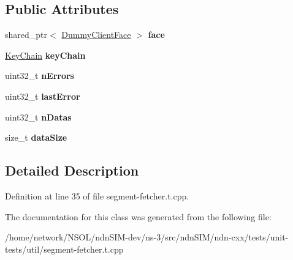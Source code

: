 \subsection*{Public Attributes}
\begin{DoxyCompactItemize}
\item 
shared\+\_\+ptr$<$ \hyperlink{classndn_1_1util_1_1DummyClientFace}{Dummy\+Client\+Face} $>$ {\bfseries face}\hypertarget{classndn_1_1util_1_1tests_1_1Fixture_aa4ae83fca5774611d7d7ae32d0dc9b52}{}\label{classndn_1_1util_1_1tests_1_1Fixture_aa4ae83fca5774611d7d7ae32d0dc9b52}

\item 
\hyperlink{classndn_1_1security_1_1KeyChain}{Key\+Chain} {\bfseries key\+Chain}\hypertarget{classndn_1_1util_1_1tests_1_1Fixture_a4f044e75670a6374d681121a3432ed2f}{}\label{classndn_1_1util_1_1tests_1_1Fixture_a4f044e75670a6374d681121a3432ed2f}

\item 
uint32\+\_\+t {\bfseries n\+Errors}\hypertarget{classndn_1_1util_1_1tests_1_1Fixture_a155892280dcdfea98ea093622b2a0b4e}{}\label{classndn_1_1util_1_1tests_1_1Fixture_a155892280dcdfea98ea093622b2a0b4e}

\item 
uint32\+\_\+t {\bfseries last\+Error}\hypertarget{classndn_1_1util_1_1tests_1_1Fixture_a1207838d6188fd3070b23c27f243d731}{}\label{classndn_1_1util_1_1tests_1_1Fixture_a1207838d6188fd3070b23c27f243d731}

\item 
uint32\+\_\+t {\bfseries n\+Datas}\hypertarget{classndn_1_1util_1_1tests_1_1Fixture_a6cb67afd27a0b2bcc925313abf33c825}{}\label{classndn_1_1util_1_1tests_1_1Fixture_a6cb67afd27a0b2bcc925313abf33c825}

\item 
size\+\_\+t {\bfseries data\+Size}\hypertarget{classndn_1_1util_1_1tests_1_1Fixture_a680aeeaf5bdc669b95e99882f9348937}{}\label{classndn_1_1util_1_1tests_1_1Fixture_a680aeeaf5bdc669b95e99882f9348937}

\end{DoxyCompactItemize}


\subsection{Detailed Description}


Definition at line 35 of file segment-\/fetcher.\+t.\+cpp.



The documentation for this class was generated from the following file\+:\begin{DoxyCompactItemize}
\item 
/home/network/\+N\+S\+O\+L/ndn\+S\+I\+M-\/dev/ns-\/3/src/ndn\+S\+I\+M/ndn-\/cxx/tests/unit-\/tests/util/segment-\/fetcher.\+t.\+cpp\end{DoxyCompactItemize}
